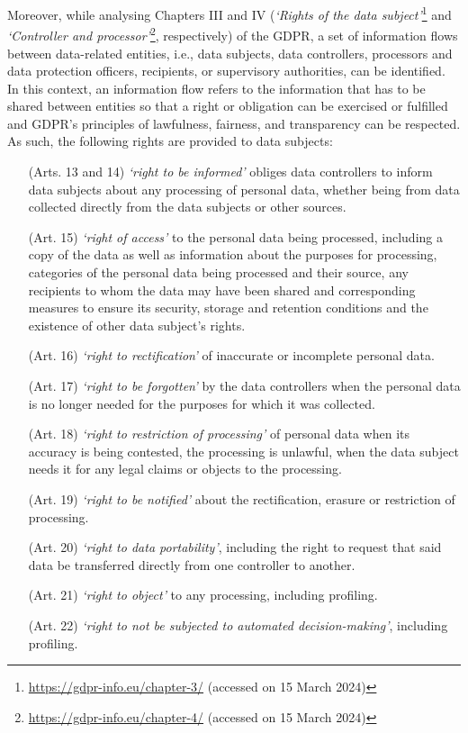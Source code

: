 Moreover, while analysing Chapters III and IV (\textit{`Rights of the data subject'}\footnote{\url{https://gdpr-info.eu/chapter-3/} (accessed on 15 March 2024)} and \textit{`Controller and processor'}\footnote{\url{https://gdpr-info.eu/chapter-4/} (accessed on 15 March 2024)}, respectively) of the GDPR, a set of information flows between data-related entities, i.e., data subjects, data controllers, processors and data protection officers, recipients, or supervisory authorities, can be identified.
In this context, an information flow refers to the information that has to be shared between entities so that a right or obligation can be exercised or fulfilled and GDPR's principles of lawfulness, fairness, and transparency can be respected.
As such, the following rights are provided to data subjects:

\begin{enumerate}
  \item[(Arts. 13 and 14)]\label{art:13-14} \textit{`right to be informed'} obliges data controllers to inform data subjects about any processing of personal data, whether being from data collected directly from the data subjects or other sources.
  \item[(Art. 15)]\label{art:15} \textit{`right of access'} to the personal data being processed, including a copy of the data as well as information about the purposes for processing, categories of the personal data being processed and their source, any recipients to whom the data may have been shared and corresponding measures to ensure its security, storage and retention conditions and the existence of other data subject's rights.
  \item[(Art. 16)]\label{art:16} \textit{`right to rectification'} of inaccurate or incomplete personal data.
  \item[(Art. 17)]\label{art:17} \textit{`right to be forgotten'} by the data controllers when the personal data is no longer needed for the purposes for which it was collected.
  \item[(Art. 18)]\label{art:18} \textit{`right to restriction of processing'} of personal data when its accuracy is being contested, the processing is unlawful, when the data subject needs it for any legal claims or objects to the processing.
  \item[(Art. 19)]\label{art:19} \textit{`right to be notified'} about the rectification, erasure or restriction of processing.
  \item[(Art. 20)]\label{art:20} \textit{`right to data portability'}, including the right to request that said data be transferred directly from one controller to another.
  \item[(Art. 21)]\label{art:21} \textit{`right to object'} to any processing, including profiling.
  \item[(Art. 22)]\label{art:22} \textit{`right to not be subjected to automated decision-making'}, including profiling.
\end{enumerate}

